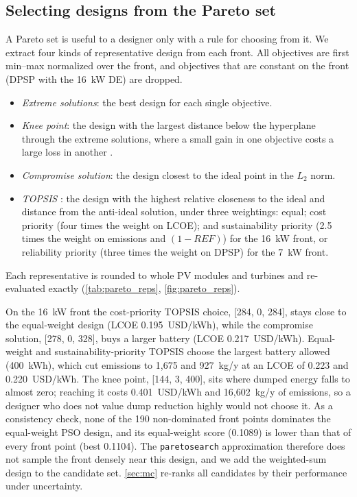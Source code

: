 \documentclass[final,3p,times]{elsarticle}
\begin{document}
\subsection{Selecting designs from the Pareto set\label{sec:pareto_select}}
A Pareto set is useful to a designer only with a rule for choosing from it. We extract four kinds of representative design from each front. All objectives are first min--max normalized over the front, and objectives that are constant on the front (DPSP with the 16~kW DE) are dropped.
\begin{itemize}
\item \textit{Extreme solutions}: the best design for each single objective.
\item \textit{Knee point}: the design with the largest distance below the hyperplane through the extreme solutions, where a small gain in one objective costs a large loss in another \cite{deb2011knee}.
\item \textit{Compromise solution}: the design closest to the ideal point in the $L_2$ norm.
\item \textit{TOPSIS} \cite{hwang1981topsis}: the design with the highest relative closeness to the ideal and distance from the anti-ideal solution, under three weightings: equal; cost priority (four times the weight on LCOE); and sustainability priority (2.5 times the weight on emissions and $(1-REF)$) for the 16~kW front, or reliability priority (three times the weight on DPSP) for the 7~kW front.
\end{itemize}
Each representative is rounded to whole PV modules and turbines and re-evaluated exactly (\cref{tab:pareto_reps}, \cref{fig:pareto_reps}).

On the 16~kW front the cost-priority TOPSIS choice, [284, 0, 284], stays close to the equal-weight design (LCOE 0.195~USD/kWh), while the compromise solution, [278, 0, 328], buys a larger battery (LCOE 0.217~USD/kWh). Equal-weight and sustainability-priority TOPSIS choose the largest battery allowed (400~kWh), which cut emissions to 1,675 and 927~kg/y at an LCOE of 0.223 and 0.220~USD/kWh. The knee point, [144, 3, 400], sits where dumped energy falls to almost zero; reaching it costs 0.401~USD/kWh and 16,602~kg/y of emissions, so a designer who does not value dump reduction highly would not choose it. As a consistency check, none of the 190 non-dominated front points dominates the equal-weight PSO design, and its equal-weight score (0.1089) is lower than that of every front point (best 0.1104). The \texttt{paretosearch} approximation therefore does not sample the front densely near this design, and we add the weighted-sum design to the candidate set. \cref{sec:mc} re-ranks all candidates by their performance under uncertainty.
\end{document}
